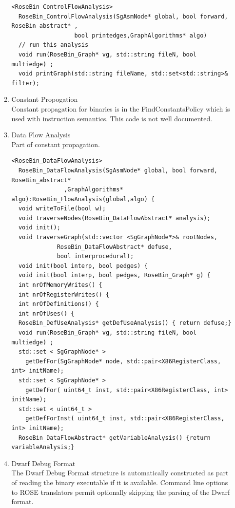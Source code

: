 \begin{enumerate}
\begin{enumerate}
      \begin{lstlisting}
<RoseBin_ControlFlowAnalysis>
  RoseBin_ControlFlowAnalysis(SgAsmNode* global, bool forward, RoseBin_abstract* ,
			      bool printedges,GraphAlgorithms* algo)
  // run this analysis
  void run(RoseBin_Graph* vg, std::string fileN, bool multiedge) ;
  void printGraph(std::string fileName, std::set<std::string>& filter);

      \end{lstlisting}

      \item Constant Propogation \\
      Constant propagation for binaries is in the
      FindConstantsPolicy which is used with instruction
      semantics. This code is not well documented.

      \item Data Flow Analysis \\
      Part of constant propagation.

      \begin{lstlisting}
<RoseBin_DataFlowAnalysis>
  RoseBin_DataFlowAnalysis(SgAsmNode* global, bool forward, RoseBin_abstract*
			   ,GraphAlgorithms* algo):RoseBin_FlowAnalysis(global,algo) {
  void writeToFile(bool w);
  void traverseNodes(RoseBin_DataFlowAbstract* analysis);
  void init();
  void traverseGraph(std::vector <SgGraphNode*>& rootNodes,
		     RoseBin_DataFlowAbstract* defuse,
		     bool interprocedural);
  void init(bool interp, bool pedges) {
  void init(bool interp, bool pedges, RoseBin_Graph* g) {
  int nrOfMemoryWrites() {
  int nrOfRegisterWrites() {
  int nrOfDefinitions() {
  int nrOfUses() {
  RoseBin_DefUseAnalysis* getDefUseAnalysis() { return defuse;}
  void run(RoseBin_Graph* vg, std::string fileN, bool multiedge) ;
  std::set < SgGraphNode* >
    getDefFor(SgGraphNode* node, std::pair<X86RegisterClass, int> initName);
  std::set < SgGraphNode* >
    getDefFor( uint64_t inst, std::pair<X86RegisterClass, int> initName);
  std::set < uint64_t >
    getDefForInst( uint64_t inst, std::pair<X86RegisterClass, int> initName);
  RoseBin_DataFlowAbstract* getVariableAnalysis() {return variableAnalysis;}

      \end{lstlisting}



      \item Dwarf Debug Format \\
      The Dwarf Debug Format structure is automatically constructed 
      as part of reading the binary executable if it is available.
      Command line options to ROSE translators permit optionally 
      skipping the parsing of the Dwarf format.
   \end{enumerate}
\end{enumerate}

